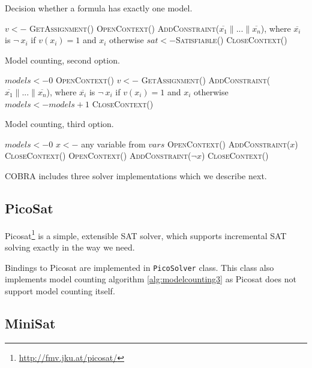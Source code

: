 \begin{algorithm}[ht]
\caption{Decision whether a formula has exactly one model.}
\label{alg:onlyonemodel}
\DontPrintSemicolon
{}
$v <- $ \textsc{GetAssignment()}\;
\textsc{OpenContext()}\;
\textsc{AddConstraint($\overline{x_1}\| ... \|\overline{x_n}$)},
  where $\overline{x_i}$ is $\neg\:x_i$ if $v(x_i) = 1$ and $x_i$ otherwise\;
$sat <- $\textsc{Satisfiable()}\;
\textsc{CloseContext()}\;
\end{algorithm}
\begin{algorithm}[ht]
\caption{Model counting, second option.}
\label{alg:modelcounting2}
\DontPrintSemicolon
$models <- 0$\;
\textsc{OpenContext()}\;
 {
  $v <- $ \textsc{GetAssignment()}\;
  \textsc{AddConstraint($\overline{x_1}\| ... \|\overline{x_n}$)},
    where $\overline{x_i}$ is $\neg\:x_i$ if $v(x_i) = 1$ and $x_i$ otherwise\;
  $models <- models + 1$\;
}
\textsc{CloseContext()}\;
\end{algorithm}
\begin{algorithm}[h!]
\caption{Model counting, third option.}
\label{alg:modelcounting3}
\DontPrintSemicolon
$models <- 0$\;
$x <- $ any variable from $vars$\;
\textsc{OpenContext()}\;
\textsc{AddConstraint}($x$)\;
\textsc{CloseContext()}\;
\textsc{OpenContext()}\;
\textsc{AddConstraint}($\neg x$)\;
\textsc{CloseContext()}\;
\end{algorithm}

COBRA includes three solver implementations which we describe next.

\subsection{PicoSat}
Picosat\footnote{\url{http://fmv.jku.at/picosat/}} \cite{picosat} is a simple,
  extensible SAT solver, which supports incremental SAT solving exactly in the way
  we need.

Bindings to Picosat are implemented in \texttt{PicoSolver} class.
This class also implements model counting algorithm \ref{alg:modelcounting3}
 as Picosat does not support model counting itself.


\subsection{MiniSat}

